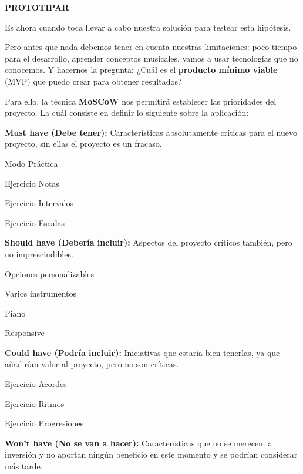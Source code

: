 \documentclass[12pt,twoside,titlepage]{report}
\begin{document}
\textbf{PROTOTIPAR}

Es ahora cuando toca llevar a cabo nuestra solución para testear esta hipótesis. 

Pero antes que nada debemos tener en cuenta nuestras limitaciones: poco tiempo para el desarrollo, aprender conceptos musicales, vamos a usar tecnologías que no conocemos. Y hacernos la pregunta: ¿Cuál es el \textbf{producto mínimo viable} (MVP) que puedo crear para obtener resultados?

Para ello, la técnica \textbf{MoSCoW} nos permitirá establecer las prioridades del proyecto. La cuál consiste en definir lo siguiente sobre la aplicación:

\textbf{Must have (Debe tener):} Características absolutamente críticas para el nuevo proyecto, sin ellas el proyecto es un fracaso.

\begin{compactitem}
    \item Modo Práctica
    \item Ejercicio Notas
    \item Ejercicio Intervalos
    \item Ejercicio Escalas
\end{compactitem}

\textbf{Should have (Debería incluir):} Aspectos del proyecto críticos también, pero no imprescindibles.

\begin{compactitem}
    \item Opciones personalizables
    \item Varios instrumentos
    \item Piano
    \item Responsive
\end{compactitem}

\textbf{Could have (Podría incluir):} Iniciativas que estaría bien tenerlas, ya que añadirían valor al proyecto, pero no son críticas.

\begin{compactitem}
    \item Ejercicio Acordes
    \item Ejercicio Ritmos
    \item Ejercicio Progresiones
\end{compactitem}

\textbf{Won’t have (No se van a hacer):} Características que no se merecen la inversión y no aportan ningún beneficio en este momento y se podrían considerar más tarde.
\end{document}
